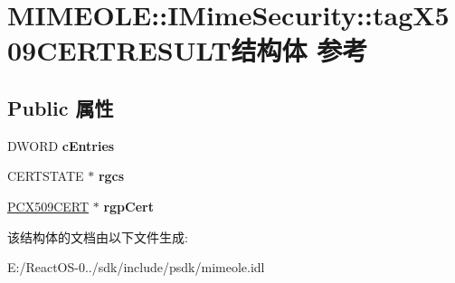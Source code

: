 \hypertarget{struct_m_i_m_e_o_l_e_1_1_i_mime_security_1_1tag_x509_c_e_r_t_r_e_s_u_l_t}{}\section{M\+I\+M\+E\+O\+LE\+:\+:I\+Mime\+Security\+:\+:tag\+X509\+C\+E\+R\+T\+R\+E\+S\+U\+L\+T结构体 参考}
\label{struct_m_i_m_e_o_l_e_1_1_i_mime_security_1_1tag_x509_c_e_r_t_r_e_s_u_l_t}
\subsection*{Public 属性}
\begin{DoxyCompactItemize}
\item 
\mbox{\label{struct_m_i_m_e_o_l_e_1_1_i_mime_security_1_1tag_x509_c_e_r_t_r_e_s_u_l_t_a78aaf4b04e0f2f5868765292efff104e}} 
D\+W\+O\+RD {\bfseries c\+Entries}
\item 
\mbox{\label{struct_m_i_m_e_o_l_e_1_1_i_mime_security_1_1tag_x509_c_e_r_t_r_e_s_u_l_t_a1037ac921eb52669cb6ca3a2b046474e}} 
C\+E\+R\+T\+S\+T\+A\+TE $\ast$ {\bfseries rgcs}
\item 
\mbox{\label{struct_m_i_m_e_o_l_e_1_1_i_mime_security_1_1tag_x509_c_e_r_t_r_e_s_u_l_t_afb293afed0b03c07c5b1585bbf321ec3}} 
\hyperlink{struct___c_e_r_t___c_o_n_t_e_x_t}{P\+C\+X509\+C\+E\+RT} $\ast$ {\bfseries rgp\+Cert}
\end{DoxyCompactItemize}


该结构体的文档由以下文件生成\+:\begin{DoxyCompactItemize}
\item 
E\+:/\+React\+O\+S-\/0../sdk/include/psdk/mimeole.\+idl\end{DoxyCompactItemize}
